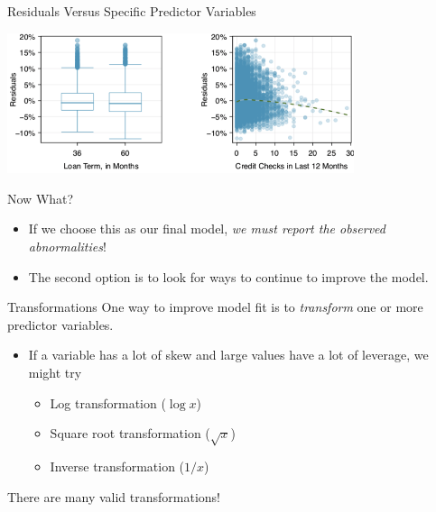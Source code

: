 \begin{frame}{Residuals Versus Specific Predictor Variables}
    \begin{center}
        \includegraphics[width=4in]{images/multregvars3.png}
    \end{center}
\end{frame}

\begin{frame}{Now What?}
    \begin{itemize}
        \item If we choose this as our final model, \textit{we must report the observed abnormalities}!
        \item The second option is to look for ways to continue to improve the model.
    \end{itemize}
\end{frame}

\begin{frame}{Transformations}
    One way to improve model fit is to \textit{transform} one or more predictor variables. 
    \begin{itemize}
        \item If a variable has a lot of skew and large values have a lot of leverage, we might try
        \begin{itemize}
            \item Log transformation ($\log{x}$)
            \item Square root transformation ($\sqrt{x}$)
            \item Inverse transformation ($1/x$)
        \end{itemize}
    \end{itemize}
    There are many valid transformations! 
\end{frame}

